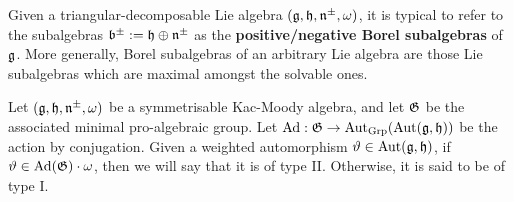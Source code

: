         Given a triangular-decomposable Lie algebra $(\mathfrak{g}, \mathfrak{h}, \mathfrak{n}^{\pm}, \omega)$, it is typical to refer to the subalgebras $\mathfrak{b}^{\pm} := \mathfrak{h} \oplus \mathfrak{n}^{\pm}$ as the \textbf{positive/negative Borel subalgebras} of $\mathfrak{g}$. More generally, Borel subalgebras of an arbitrary Lie algebra are those Lie subalgebras which are maximal amongst the solvable ones.

        \begin{proposition} \label{prop: minimal_kac_moody_groups}
        \end{proposition}

        \begin{definition} \label{def: weighted_automorphisms_of_types_I_and_II}
            Let $(\mathfrak{g}, \mathfrak{h}, \mathfrak{n}^{\pm}, \omega)$ be a symmetrisable Kac-Moody algebra, and let $\mathfrak{G}$ be the associated minimal pro-algebraic group. Let $\mathrm{Ad}: \mathfrak{G} \to \operatorname{Aut}_{\mathrm{Grp}}( \operatorname{Aut}(\mathfrak{g}, \mathfrak{h}) )$ be the action by conjugation. Given a weighted automorphism $\vartheta \in \operatorname{Aut}(\mathfrak{g}, \mathfrak{h})$, if $\vartheta \in \mathrm{Ad}(\mathfrak{G}) \cdot \omega$, then we will say that it is of type II. Otherwise, it is said to be of type I.
        \end{definition}